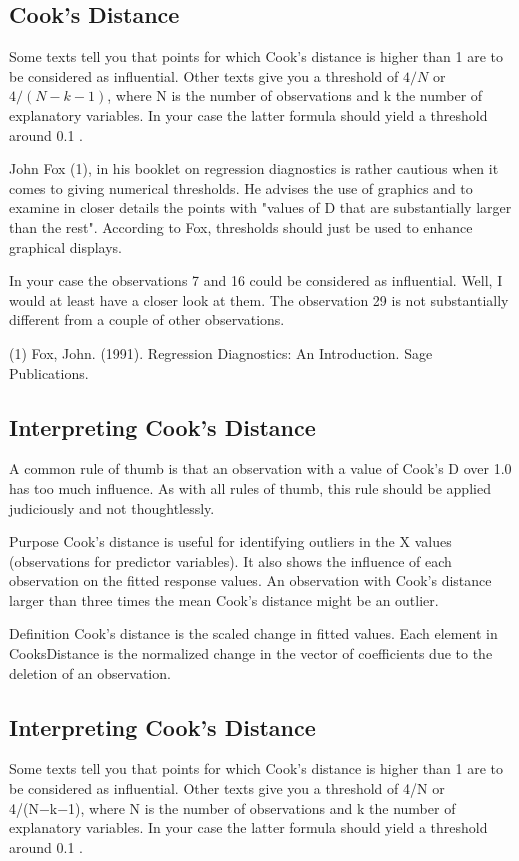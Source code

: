 \documentclass[residuals.tex]{subfiles}
\begin{document}
\subsection{Cook's Distance}
Some texts tell you that points for which Cook's distance is higher than 1 are to be considered as influential. Other texts give you a threshold of $4/N$ or $4/(N−k−1)$, where N is the number of observations and k the number of explanatory variables. In your case the latter formula should yield a threshold around 0.1 .

John Fox (1), in his booklet on regression diagnostics is rather cautious when it comes to giving numerical thresholds. He advises the use of graphics and to examine in closer details the points with "values of D that are substantially larger than the rest". According to Fox, thresholds should just be used to enhance graphical displays.

In your case the observations 7 and 16 could be considered as influential. Well, I would at least have a closer look at them. The observation 29 is not substantially different from a couple of other observations.

(1) Fox, John. (1991). Regression Diagnostics: An Introduction. Sage Publications.

\subsection{Interpreting Cook's Distance}
A common rule of thumb is that an observation with a value of Cook's D over 1.0 has too much influence. As with all rules of thumb, this rule should be applied judiciously and not thoughtlessly.


\newpage	
	Purpose
	Cook's distance is useful for identifying outliers in the X values (observations for predictor variables). It also shows the influence of each observation on the fitted response values. An observation with Cook's distance larger than three times the mean Cook's distance might be an outlier.
	
	Definition
	Cook's distance is the scaled change in fitted values. Each element in CooksDistance is the normalized change in the vector of coefficients due to the deletion of an observation. 
	
\subsection*{Interpreting Cook's Distance}	
Some texts tell you that points for which Cook's distance is higher than 1 are to be considered as influential. Other texts give you a threshold of 4/N or 4/(N−k−1), where N is the number of observations and k the number of explanatory variables. In your case the latter formula should yield a threshold around 0.1 .
\end{document}
